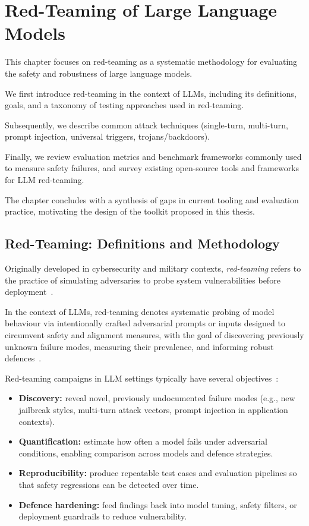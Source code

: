 \chapter{Red-Teaming of Large Language Models}\label{ch:red-teaming}

This chapter focuses on red-teaming as a systematic methodology for evaluating the safety and robustness of large language models.

We first introduce red-teaming in the context of LLMs, including its definitions, goals, and a taxonomy of testing approaches used in red-teaming.

Subsequently, we describe common attack techniques (single-turn, multi-turn, prompt injection, universal triggers, trojans/backdoors).

Finally, we review evaluation metrics and benchmark frameworks commonly used to measure safety failures, and survey existing open-source tools and frameworks for LLM red-teaming.

The chapter concludes with a synthesis of gaps in current tooling and evaluation practice, motivating the design of the toolkit proposed in this thesis.

\section{Red-Teaming: Definitions and Methodology}\label{sec:red-teaming-def}

Originally developed in cybersecurity and military contexts, \emph{red-teaming} refers to the practice of simulating adversaries to probe system vulnerabilities before deployment~\cite{purpura2025building}.

In the context of LLMs, red-teaming denotes systematic probing of model behaviour via intentionally crafted adversarial prompts or inputs designed to circumvent safety and alignment measures, with the goal of discovering previously unknown failure modes, measuring their prevalence, and informing robust defences~\cite{schoepf2025madmax, belaire2025automatic}.

Red-teaming campaigns in LLM settings typically have several objectives~\cite{purpura2025building, schoepf2025madmax}:

\begin{itemize}
  \item \textbf{Discovery:} reveal novel, previously undocumented failure modes (e.g., new jailbreak styles, multi-turn attack vectors, prompt injection in application contexts).  
  \item \textbf{Quantification:} estimate how often a model fails under adversarial conditions, enabling comparison across models and defence strategies.  
  \item \textbf{Reproducibility:} produce repeatable test cases and evaluation pipelines so that safety regressions can be detected over time.  
  \item \textbf{Defence hardening:} feed findings back into model tuning, safety filters, or deployment guardrails to reduce vulnerability.  
\end{itemize}

